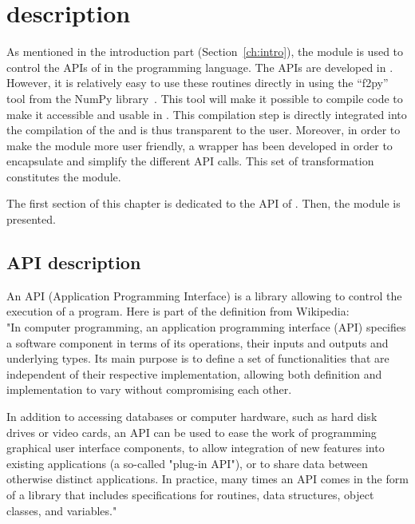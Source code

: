 \chapter{\TelApy{} description}\label{ch:TelApy_description}

As mentioned in the introduction part (Section~\ref{ch:intro}), the \TelApy{}
module is used to control the APIs of \telemacsystem{} in the \python{}
programming language. The \telemacsystem{} APIs are developed in \fortran{}.
However, it is relatively easy to use these \fortran{} routines directly in
\python{} using the ``f2py'' tool from the \python{} NumPy
library~\cite{Peterson2009}. This tool will make it possible to compile
\fortran{} code to make it accessible and usable in \python{}. This compilation
step is directly integrated into the compilation of the \telemacsystem{} and is
thus transparent to the user. Moreover, in order to make the \TelApy{} module
more user friendly, a \python{} wrapper has been developed in order to
encapsulate and simplify the different API \python{} calls. This set of
transformation constitutes the \TelApy{} module.

The first section of this chapter is dedicated to the \fortran{} API of
\telemacsystem{}. Then, the \python{} \TelApy{} module is presented.

\section{\telemacsystem{} \fortran{} API description}
%
An API (Application Programming Interface) is a library allowing to control the
execution of a program. Here is part of the definition from Wikipedia:\\

"In computer programming, an application programming interface (API) specifies
a software component in terms of its operations, their inputs and outputs and
underlying types. Its main purpose is to define a set of functionalities that
are independent of their respective implementation, allowing both definition
and implementation to vary without compromising each other.

In addition to accessing databases or computer hardware, such as hard disk
drives or video cards, an API can be used to ease the work of programming
graphical user interface components, to allow integration of new features into
existing applications (a so-called "plug-in API"), or to share data between
otherwise distinct applications. In practice, many times an API comes in the
form of a library that includes specifications for routines, data structures,
object classes, and variables." \\

